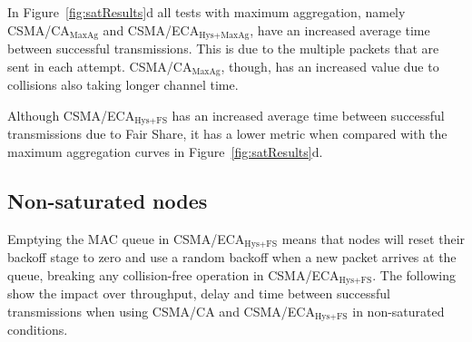 	In Figure~\ref{fig:satResults}d all tests with maximum aggregation, namely CSMA/CA$_{\text{MaxAg}}$ and CSMA/ECA$_{\text{Hys+MaxAg}}$, have an increased average time between successful transmissions. This is due to the multiple packets that are sent in each attempt. CSMA/CA$_{\text{MaxAg}}$, though, has an increased value due to collisions also taking longer channel time.
	
	Although CSMA/ECA$_{\text{Hys+FS}}$ has an increased average time between successful transmissions due to Fair Share, it has a lower metric when compared with the maximum aggregation curves in Figure~\ref{fig:satResults}d.




	\subsection{Non-saturated nodes}\label{resultsUnsaturated}
	

	
	Emptying the MAC queue in CSMA/ECA$_{\text{Hys+FS}}$ means that nodes will reset their backoff stage to zero and use a random backoff when a new packet arrives at the queue, breaking any collision-free operation in CSMA/ECA$_{\text{Hys+FS}}$. The following show the impact over throughput, delay and time between successful transmissions when using CSMA/CA and CSMA/ECA$_{\text{Hys+FS}}$ in non-saturated conditions.\\
	

